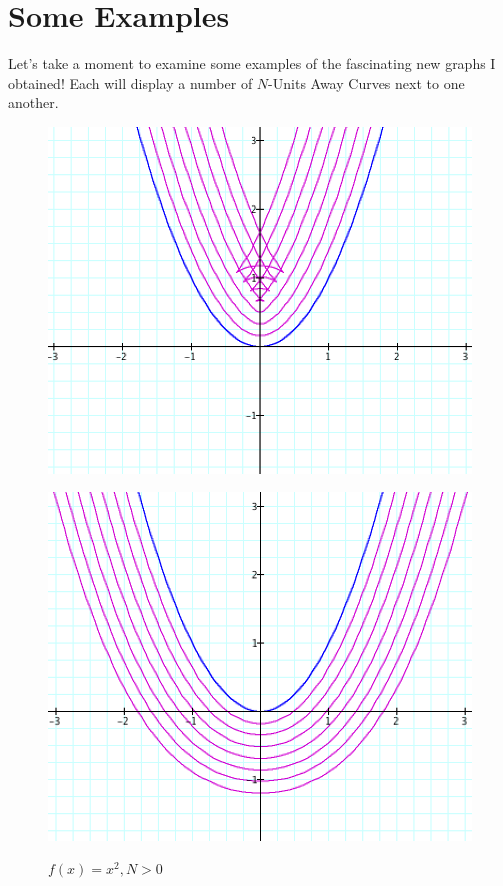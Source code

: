 \section{Some Examples}

Let’s take a moment to examine some examples of the fascinating new graphs I obtained! Each will display a number of $N$-Units Away Curves next to one another.

\renewcommand\w{.40\linewidth}
\renewcommand\fw{.90\textwidth}

\begin{figure}[H]
  \centering
  \begin{minipage}[b]{\w}
    \centering
    \label{example:1}
    \includegraphics[width=\fw]{img/03-some-examples/01.png}
    \caption{$ f(x) = x ^ 2, N > 0 $}
    \vspace{4ex}
  \end{minipage} %
  \begin{minipage}[b]{\w}
    \centering
    \label{example:2}
    \includegraphics[width=\fw]{img/03-some-examples/02.png}

\end{minipage}
\end{figure}
